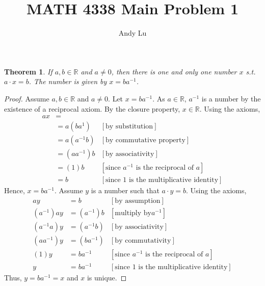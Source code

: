 \documentclass{article}
\title{MATH 4338 Main Problem 1}
\date{}
\author{Andy Lu}
\newtheorem{theorem}{Theorem}
\begin{document}
  \maketitle
  \begin{theorem}
    If $a, b \in \mathbb{R}$  and $a \neq 0$, then there is one and only one
     number $x$ s.t. $a \cdot x = b$. The number is given by $x = ba^{-1}$.
  \end{theorem}
  
  \begin{proof}
    Assume $a, b \in \mathbb{R}$ and $a \neq 0$. Let $x = ba^{-1}$. As $a
     \in \mathbb{R}$, $a^{-1}$ is a number by the existence of a reciprocal 
     axiom. By the closure property, $x \in \mathbb{R}$. Using the
    axioms,
    \begin{align*}
      ax & = \\
         & = a(ba^{1}) & [\text{by substitution}]\\
         & = a(a^{-1}b) & [\text{by commutative property}]\\
         & = (aa^{-1})b & [\text{by associativity}]\\
         & = (1)b & [\text{since } a^{-1} \text{ is the reciprocal of } a]\\
         & = b & [\text{since } 1 \text{ is the multiplicative identity}]
    \end{align*}
    Hence, $x=ba^{-1}$. Assume $y$ is a number such that $a \cdot y = b$.
    Using the axioms,
    \begin{align*}
      ay & = b & [\text{by assumption}]\\
      (a^{-1})ay & = (a^{-1})b & [\text{multiply by} a^{-1}]\\
      (a^{-1}a)y & = (a^{-1}b) & [\text{by associativity}]\\
      (aa^{-1})y & = (ba^{-1}) & [\text{by commutativity}]\\
      (1)y & = ba^{-1} & [\text{since } a^{-1} \text{ is the reciprocal of } a]\\
      y & = ba^{-1} & [\text{since } 1 \text{ is the multiplicative identity}]
    \end{align*}
    Thus, $y=ba^{-1}=x$ and $x$ is unique.
  \end{proof}
\end{document}
